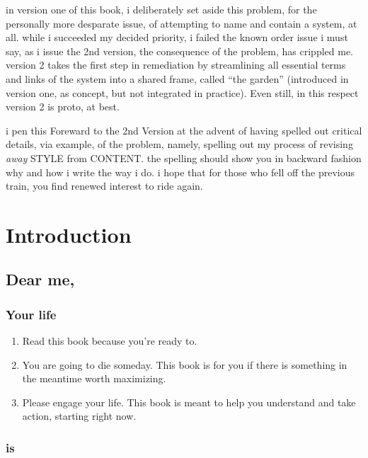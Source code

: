 \documentclass[
]{book}
\providecommand{\tightlist}{%
  \setlength{\itemsep}{0pt}\setlength{\parskip}{0pt}}
\begin{document}
in version one of this book, i deliberately set aside this problem, for the personally more desparate issue, of attempting to name and contain a system, at all. while i succeeded my decided priority, i failed the known order issue
i must say, as i issue the 2nd version, the consequence of the problem, has crippled me.
version 2 takes the first step in remediation by streamlining all essential terms and links of the system into a shared frame, called ``the garden'' (introduced in version one, as concept, but not integrated in practice). Even still, in this respect version 2 is proto, at best.

i pen this Foreward to the 2nd Version at the advent of having spelled out critical details, via example, of the problem, namely, spelling out my process of revising \emph{away} STYLE from CONTENT. the spelling should show you in backward fashion why and how i write the way i do.
i hope that for those who fell off the previous train, you find renewed interest to ride again.

\hypertarget{introduction}{%
\chapter{Introduction}\label{introduction}}

\hypertarget{dear-me}{%
\section{Dear me,}\label{dear-me}}

\hypertarget{your-life}{%
\subsection{Your life}\label{your-life}}

\begin{enumerate}
\def\labelenumi{\arabic{enumi}.}
\tightlist
\item
  Read this book because you're ready to.
\item
  You are going to die someday. This book is for you if there is something in the
  meantime worth maximizing.
\item
  Please engage your life.
  This book is meant to help you understand and take action, starting right now.
\end{enumerate}

\hypertarget{is}{%
\subsection{is}\label{is}}
\end{document}
